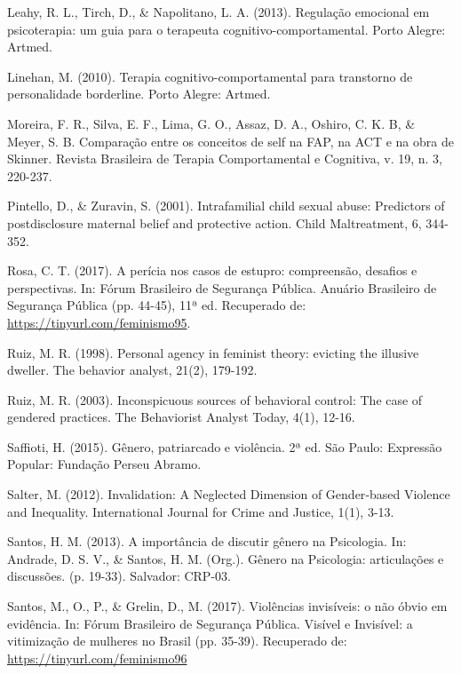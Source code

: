 \hangindent=25pt
\noindent Leahy, R. L., Tirch, D., \& Napolitano, L. A. (2013). Regulação emocional em psicoterapia: um guia para o terapeuta cognitivo-compor\-tamental. Porto Alegre: Artmed.

\hangindent=25pt
\noindent Linehan, M. (2010). Terapia cognitivo-comportamental para transtorno de personalidade borderline. Porto Alegre: Artmed. 

\hangindent=25pt
\noindent Moreira, F. R., Silva, E. F., Lima, G. O., Assaz, D. A., Oshiro, C. K. B, \& Meyer, S. B. Comparação entre os conceitos de self na FAP, na ACT e na obra de Skinner. Revista Brasileira de Terapia Comportamental e Cognitiva, v. 19, n. 3, 220-237.

\hangindent=25pt
\noindent Pintello, D., \& Zuravin, S. (2001). Intrafamilial child sexual abuse: Predictors of postdisclosure maternal belief and protective action. Child Maltreatment, 6, 344-352.

\hangindent=25pt
\noindent Rosa, C. T. (2017). A perícia nos casos de estupro: compreensão, desafios e perspectivas. In: Fórum Brasileiro de Segurança Pública. Anuário Brasileiro de Segurança Pública (pp. 44-45), 11ª ed. Recuperado de: \url{https://tinyurl.com/feminismo95}.

\hangindent=25pt
\noindent Ruiz, M. R. (1998). Personal agency in feminist theory: evicting the illusive dweller. The behavior analyst, 21(2), 179-192.

\hangindent=25pt
\noindent Ruiz, M. R. (2003). Inconspicuous sources of behavioral control: The case of gendered practices. The Behaviorist Analyst Today, 4(1), 12-16. 

\hangindent=25pt
\noindent Saffioti, H. (2015). Gênero, patriarcado e violência. 2ª ed. São Paulo: Expressão Popular: Fundação Perseu Abramo.

\hangindent=25pt
\noindent Salter, M. (2012). Invalidation: A Neglected Dimension of Gender‐based Violence and Inequality. International Journal for Crime and Justice, 1(1), 3-13.

\hangindent=25pt
\noindent Santos, H. M. (2013). A importância de discutir gênero na Psicologia. In: Andrade, D. S. V., \& Santos, H. M. (Org.). Gênero na Psicologia: articulações e discussões. (p. 19-33). Salvador: CRP-03.

\hangindent=25pt
\noindent Santos, M., O., P., \& Grelin, D., M. (2017). Violências invisíveis: o não óbvio em evidência. In: Fórum Brasileiro de Segurança Pública. Visível e Invisível: a vitimização de mulheres no Brasil (pp. 35-39). Recuperado de: \url{https://tinyurl.com/feminismo96}

